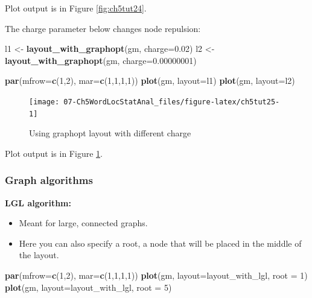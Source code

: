 \documentclass[
]{article}
\newenvironment{Shaded}{\begin{snugshade}}{\end{snugshade}}
\newcommand{\AttributeTok}[1]{\textcolor[rgb]{0.13,0.29,0.53}{#1}}
\newcommand{\DecValTok}[1]{\textcolor[rgb]{0.00,0.00,0.81}{#1}}
\newcommand{\FloatTok}[1]{\textcolor[rgb]{0.00,0.00,0.81}{#1}}
\newcommand{\FunctionTok}[1]{\textcolor[rgb]{0.13,0.29,0.53}{\textbf{#1}}}
\newcommand{\NormalTok}[1]{#1}
\newcommand{\OtherTok}[1]{\textcolor[rgb]{0.56,0.35,0.01}{#1}}
\providecommand{\tightlist}{%
  \setlength{\itemsep}{0pt}\setlength{\parskip}{0pt}}
\begin{document}
Plot output is in Figure \ref{fig:ch5tut24}.

The charge parameter below changes node repulsion:

\begin{Shaded}
\begin{Highlighting}[]
\NormalTok{l1 }\OtherTok{\textless{}{-}} \FunctionTok{layout\_with\_graphopt}\NormalTok{(gm, }\AttributeTok{charge=}\FloatTok{0.02}\NormalTok{)}
\NormalTok{l2 }\OtherTok{\textless{}{-}} \FunctionTok{layout\_with\_graphopt}\NormalTok{(gm, }\AttributeTok{charge=}\FloatTok{0.00000001}\NormalTok{)}
 
\FunctionTok{par}\NormalTok{(}\AttributeTok{mfrow=}\FunctionTok{c}\NormalTok{(}\DecValTok{1}\NormalTok{,}\DecValTok{2}\NormalTok{), }\AttributeTok{mar=}\FunctionTok{c}\NormalTok{(}\DecValTok{1}\NormalTok{,}\DecValTok{1}\NormalTok{,}\DecValTok{1}\NormalTok{,}\DecValTok{1}\NormalTok{))}
\FunctionTok{plot}\NormalTok{(gm, }\AttributeTok{layout=}\NormalTok{l1)}
\FunctionTok{plot}\NormalTok{(gm, }\AttributeTok{layout=}\NormalTok{l2)}
\end{Highlighting}
\end{Shaded}

\begin{figure}

{\centering \texttt{[image: 07-Ch5WordLocStatAnal\_files/figure-latex/ch5tut25-1]} 

}

\caption{Using graphopt layout with different charge}\label{fig:ch5tut25}
\end{figure}

Plot output is in Figure \ref{fig:ch5tut25}.

\hypertarget{graph-algorithms}{%
\subsubsection{Graph algorithms}\label{graph-algorithms}}

\textbf{LGL algorithm:}

\begin{itemize}
\tightlist
\item
  Meant for large, connected graphs.
\item
  Here you can also specify a root, a node that will be placed in the middle of the layout.
\end{itemize}

\begin{Shaded}
\begin{Highlighting}[]
\FunctionTok{par}\NormalTok{(}\AttributeTok{mfrow=}\FunctionTok{c}\NormalTok{(}\DecValTok{1}\NormalTok{,}\DecValTok{2}\NormalTok{), }\AttributeTok{mar=}\FunctionTok{c}\NormalTok{(}\DecValTok{1}\NormalTok{,}\DecValTok{1}\NormalTok{,}\DecValTok{1}\NormalTok{,}\DecValTok{1}\NormalTok{))}
\FunctionTok{plot}\NormalTok{(gm, }\AttributeTok{layout=}\NormalTok{layout\_with\_lgl, }\AttributeTok{root =} \DecValTok{1}\NormalTok{)}
\FunctionTok{plot}\NormalTok{(gm, }\AttributeTok{layout=}\NormalTok{layout\_with\_lgl, }\AttributeTok{root =} \DecValTok{5}\NormalTok{)}
\end{Highlighting}
\end{Shaded}
\end{document}
